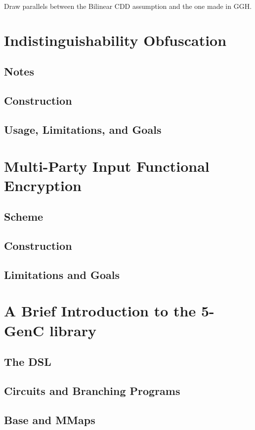 \documentclass[12pt,twoside]{reedthesis}
\begin{document}
    Draw parallels between the Bilinear CDD assumption and the one made in GGH.
    
    \chapter{Indistinguishability Obfuscation}
    
    
    \section{Notes}
       
    \section{Construction}
    \section{Usage, Limitations, and Goals}
    
    
    
    
    \chapter{Multi-Party Input Functional Encryption}
    \section{Scheme}
    \section{Construction}
    \section{Limitations and Goals}
    
    
    
    \chapter{ A Brief Introduction to the 5-GenC library}
    \section{ The DSL}
    \section{Circuits and Branching Programs}
    \section{Base and MMaps}
    
\end{document}
